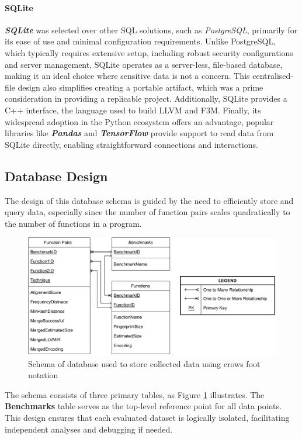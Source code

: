 \paragraph{SQLite} \textbf{\textit{SQLite}} was selected over other SQL solutions, such as \textit{PostgreSQL}, primarily for its ease of use and minimal configuration requirements. Unlike PostgreSQL, which typically requires extensive setup, including robust security configurations and server management, SQLite operates as a server-less, file-based database, making it an ideal choice where sensitive data is not a concern. This centralised-file design also simplifies creating a portable artifact, which was a prime consideration in providing a replicable project. Additionally, SQLite provides a C++ interface, the language used to build LLVM and F3M. Finally, its widespread adoption in the Python ecosystem offers an advantage, popular libraries like \textbf{\textit{Pandas}} and \textbf{\textit{TensorFlow}} provide support to read data from SQLite directly, enabling straightforward connections and interactions.

\subsection{Database Design} \label{subsection:DatabaseSchema}
The design of this database schema is guided by the need to efficiently store and query data, especially since the number of function pairs scales quadratically to the number of functions in a program.

\begin{figure}[tbh!]
\centering
\includegraphics[scale=0.85]{Figures/DataCollectionSchema.pdf}
\caption{Schema of database used to store collected data using crows foot notation}\label{fig:DatabaseSchema}
\end{figure}


The schema consists of three primary tables, as Figure \ref{fig:DatabaseSchema} illustrates. The \textbf{Benchmarks} table serves as the top-level reference point for all data points. This design ensures that each evaluated dataset is logically isolated, facilitating independent analyses and debugging if needed.

